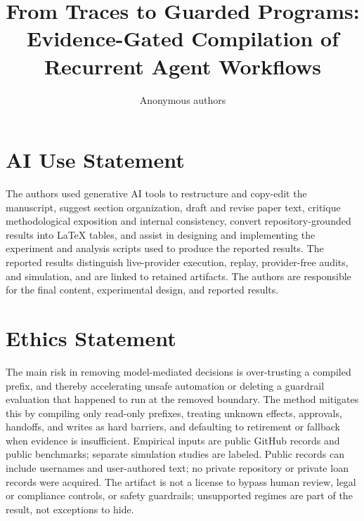 \documentclass{article}
\title{From Traces to Guarded Programs: Evidence-Gated Compilation of Recurrent Agent Workflows}
\author{Anonymous authors}
\theoremstyle{plain}
\theoremstyle{definition}
\begin{document}
\maketitle

\begin{abstract}

\end{abstract}










\section*{AI Use Statement}
The authors used generative AI tools to restructure and copy-edit the
manuscript, suggest section organization, draft and revise paper text, critique
methodological exposition and internal consistency, convert repository-grounded
results into LaTeX tables, and assist in designing and implementing the
experiment and analysis scripts used to produce the reported results. The reported results distinguish live-provider execution, replay, provider-free
audits, and simulation, and are linked to retained artifacts. The authors are
responsible for the final content, experimental design, and reported results.

\section*{Ethics Statement}
The main risk in removing model-mediated decisions is over-trusting a compiled
prefix, and thereby accelerating unsafe automation or deleting a guardrail
evaluation that happened to run at the removed boundary. The method mitigates
this by compiling only read-only prefixes, treating unknown effects, approvals,
handoffs, and writes as hard barriers, and defaulting to retirement or fallback
when evidence is insufficient. Empirical inputs are public GitHub records and public benchmarks; separate
simulation studies are labeled. Public records can include usernames and
user-authored text; no private repository or private loan records were acquired. The artifact is not a license to bypass human review, legal or
compliance controls, or safety guardrails; unsupported regimes are part of the
result, not exceptions to hide.
\end{document}
